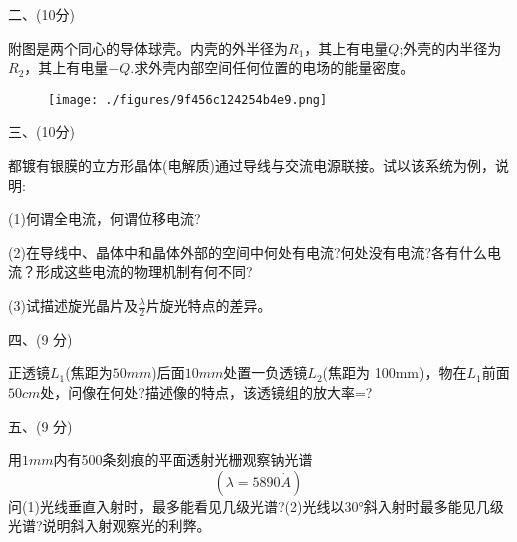 二、(10分)

附图是两个同心的导体球壳。内壳的外半径为$R_1$，其上有电量$Q$;外壳的内半径为$R_2$，其上有电量$-Q$.求外壳内部空间任何位置的电场的能量密度。
\begin{figure}[ht]
\centering
\texttt{[image: ./figures/9f456c124254b4e9.png]}
\caption{} \label{fig_PKU199_4}
\end{figure}

三、(10分)

都镀有银膜的立方形晶体(电解质)通过导线与交流电源联接。试以该系统为例，说明:

(1)何谓全电流，何谓位移电流?

(2)在导线中、晶体中和晶体外部的空间中何处有电流?何处没有电流?各有什么电流？形成这些电流的物理机制有何不同?

(3)试描述旋光晶片及$\frac{\lambda}{2}$片旋光特点的差异。

四、(9 分)

正透镜$L_1$(焦距为$50mm$)后面$10mm$处置一负透镜$L_2$(焦距为 100mm)，物在$L_1$前面$50cm$处，问像在何处?描述像的特点，该透镜组的放大率=?

五、(9 分)

用$1mm$内有500条刻痕的平面透射光栅观察钠光谱$$\left( \lambda = 5890 \dot A \right)~$$
问(1)光线垂直入射时，最多能看见几级光谱?(2)光线以30°斜入射时最多能见几级光谱?说明斜入射观察光的利弊。